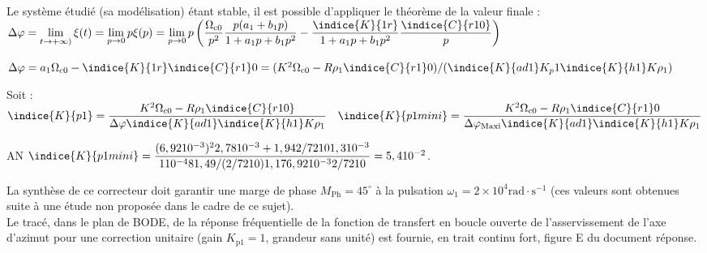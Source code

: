\ifprof
\begin{corrige}
Le système étudié (sa modélisation) étant stable, il est possible d’appliquer le théorème de la valeur finale : 
$\Delta \varphi=
\lim\limits_{t\to+\infty)}\xi (t)
=\lim\limits_{p\to 0}p\xi(p)
=\lim\limits_{p\to0} p  \left( 
\dfrac{\Omega_{\text{c0}}}{p^2}
\dfrac{p(a_1+b_1p)}{1+a_1 p +b_1   p ^2 }
-\dfrac{\indice{K}{1r}}{1+a_1 p +b_1   p ^2 }   
\dfrac{\indice{C}{r10}}{p} \right)$

$\Delta \varphi
=a_1  \Omega_{\text{c0}} -\indice{K}{1r}   \indice{C}{r1}0
=  (K^2   \Omega_{\text{c0}} -R  \rho_1   \indice{C}{r1}0)/(\indice{K}{ad1}   K _p1    \indice{K}{h1}  K  \rho_1 )$

Soit : 
$\indice{K}{p1} = \dfrac{K^2   \Omega_{\text{c0}} -R  \rho_1   \indice{C}{r10}}{\Delta \varphi  \indice{K}{ad1}   \indice{K}{h1}  K  \rho_1 } \quad    \indice{K}{p1 mini} = \dfrac{K^2   \Omega_{\text{c0}} -R  \rho_1   \indice{C}{r1}0}{\Delta \varphi_{\text{Maxi}}   \indice{K}{ad1}   \indice{K}{h1}  K  \rho_1 }$

AN  $\indice{K}{p1 mini } = \dfrac{(6,92  10^{-3} )^2   2,78  10^{-3}+1,94   2/7 210    1,3  10^{-3}}{1  10^{-4}    81,49 /(2/7 210 ) 1,17   6 ,92  10^{-3}    2/7 210 }=5,4  10^{-2}$.

\end{corrige}
\else
\fi

\ifprof
\else
La synthèse de ce correcteur doit garantir une marge de phase $M_{\mathrm{Ph}}=45^{\circ}$ à la pulsation $\omega_{1}=2 \times 10^{4} \mathrm{rad} \cdot \mathrm{s}^{-1}$ (ces valeurs sont obtenues suite à une étude non proposée dans le cadre de ce sujet).\\
Le tracé, dans le plan de BODE, de la réponse fréquentielle de la fonction de transfert en boucle ouverte de l'asservissement de l'axe d'azimut pour une correction unitaire (gain $K_{\mathrm{p} 1}=1$, grandeur sans unité) est fournie, en trait continu fort, figure E du document réponse.\\
\fi

